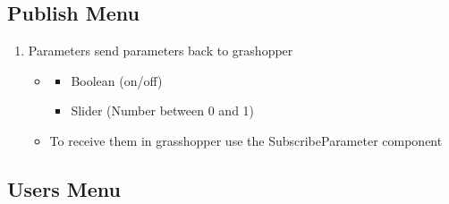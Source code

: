 \documentclass[letterpaper,10pt,english]{sphinxmanual}
\begin{document}
\sphinxstepscope


\subsection{Publish Menu}
\label{\detokenize{tutorial/Viewer_PC/documentation_rst/3_Publish:publish-menu}}\label{\detokenize{tutorial/Viewer_PC/documentation_rst/3_Publish::doc}}
\noindent{}
\begin{enumerate}
%
\setcounter{enumi}{7}
\item {} 
\sphinxAtStartPar
Parameters \sphinxhyphen{} send parameters back to grashopper
\begin{itemize}
\item {} \begin{description}
\begin{itemize}
\item {} 
\sphinxAtStartPar
Boolean (on/off)

\item {} 
\sphinxAtStartPar
Slider (Number between 0 and 1)

\end{itemize}

\end{description}

\item {} 
\sphinxAtStartPar
To receive them in grasshopper use the SubscribeParameter component

\end{itemize}

\end{enumerate}

\sphinxstepscope


\subsection{Users Menu}
\label{\detokenize{tutorial/Viewer_PC/documentation_rst/4_Users:users-menu}}\label{\detokenize{tutorial/Viewer_PC/documentation_rst/4_Users::doc}}
\noindent{}
\end{document}
